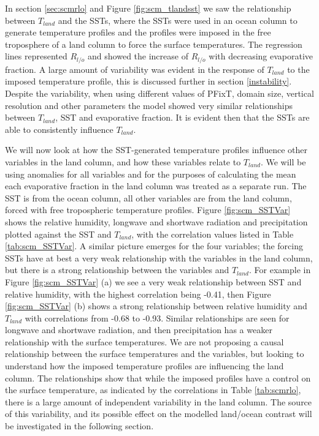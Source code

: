 In section \ref{sec:scmrlo} and Figure \ref{fig:scm_tlandsst} we saw the 
relationship between $T_{land}$ and the SSTs, where the SSTs were used in an 
ocean column to generate temperature profiles and the profiles were imposed in 
the free troposphere of a land column to force the surface temperatures.  The 
regression lines represented $R_{l/o}$ and showed the increase of $R_{l/o}$ with 
decreasing evaporative fraction.  A large amount of variability was evident in 
the response of $T_{land}$ to the imposed temperature profile, this is discussed 
further in section \ref{instability}.  Despite the variability,
when using different values of PFixT, domain size, vertical resolution and other 
parameters the model showed very similar relationships between $T_{land}$, SST 
and evaporative fraction. It is evident then that the SSTs are able to 
consistently influence $T_{land}$.

We will now look at how the SST-generated temperature profiles influence other 
variables in the land column, and how these variables relate to $T_{land}$.  We 
will be using anomalies for all variables and for the purposes of calculating 
the mean each evaporative fraction in the land column was treated as a separate 
run.  The SST is from the ocean column, all other variables are from the land 
column, forced with free tropospheric temperature profiles. Figure 
\ref{fig:scm_SSTVar} shows the relative humidity, longwave and shortwave 
radiation and precipitation plotted against the SST and $T_{land}$, with the 
correlation values listed in Table \ref{tab:scm_SSTVar}. A similar picture 
emerges for the four variables; the forcing SSTs have at best a very weak 
relationship with the variables in the land column, but there is a strong 
relationship between the variables and $T_{land}$. For example in Figure 
\ref{fig:scm_SSTVar} (a) we see a very weak relationship between SST and 
relative humidity, with the highest correlation being -0.41, then Figure 
\ref{fig:scm_SSTVar} (b) shows a strong relationship between relative humidity 
and $T_{land}$ with correlations from -0.68 to -0.93. Similar relationships are 
seen for longwave and shortwave radiation, and then precipitation has a weaker 
relationship with the surface temperatures. We are not proposing a causal 
relationship between the surface temperatures and the variables, but looking to 
understand how the imposed temperature profiles are influencing the land column.  
The relationships show that while the imposed profiles have a control on the 
surface temperature, as indicated by the correlations in Table \ref{tab:scmrlo}, 
there is a large amount of independent variability in the land column. The 
source of this variability, and its possible effect on the modelled land/ocean 
contrast will be investigated in the following section.

